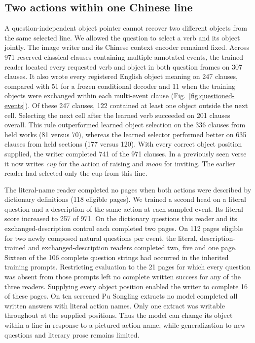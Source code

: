 \documentclass[12pt,a4paper]{article}
\providecommand{\DIFadd}[1]{{\protect\color{blue} \sf #1}} %
\begin{document}
\subsection*{\DIFadd{Two actions within one Chinese line}}
\DIFadd{A question-independent object pointer cannot recover two different objects from the same selected line. We allowed the question to select a verb and its object jointly. The image writer and its Chinese context encoder remained fixed. Across 971 reserved classical clauses containing multiple annotated events, the trained reader located every requested verb and object in both question frames on 307 clauses. It also wrote every registered English object meaning on 247 clauses, compared with 51 for a frozen conditional decoder and 11 when the training objects were exchanged within each multi-event clause (Fig.~\ref{fig:questioned-events}). Of these 247 clauses, 122 contained at least one object outside the next cell. Selecting the next cell after the learned verb succeeded on 201 clauses overall. This rule outperformed learned object selection on the 336 clauses from held works (81 versus 70), whereas the learned selector performed better on 635 clauses from held sections (177 versus 120). With every correct object position supplied, the writer completed 741 of the 971 clauses. In a previously seen verse it now writes \textit{cup} for the action of raising and \textit{moon} for inviting. The earlier reader had selected only the cup from this line.
}

\DIFadd{The literal-name reader completed no pages when both actions were described by dictionary definitions (118 eligible pages). We trained a second head on a literal question and a description of the same action at each sampled event. Its literal score increased to 257 of 971. On the dictionary questions this reader and its exchanged-description control each completed two pages. On 112 pages eligible for two newly composed natural questions per event, the literal, description-trained and exchanged-description readers completed two, five and one page. Sixteen of the 106 complete question strings had occurred in the inherited training prompts. Restricting evaluation to the 21 pages for which every question was absent from those prompts left no complete written success for any of the three readers. Supplying every object position enabled the writer to complete 16 of these pages. On ten screened Pu Songling extracts no model completed all written answers with literal action names. Only one extract was writable throughout at the supplied positions. Thus the model can change its object within a line in response to a pictured action name, while generalization to new questions and literary prose remains limited.
}
\end{document}

